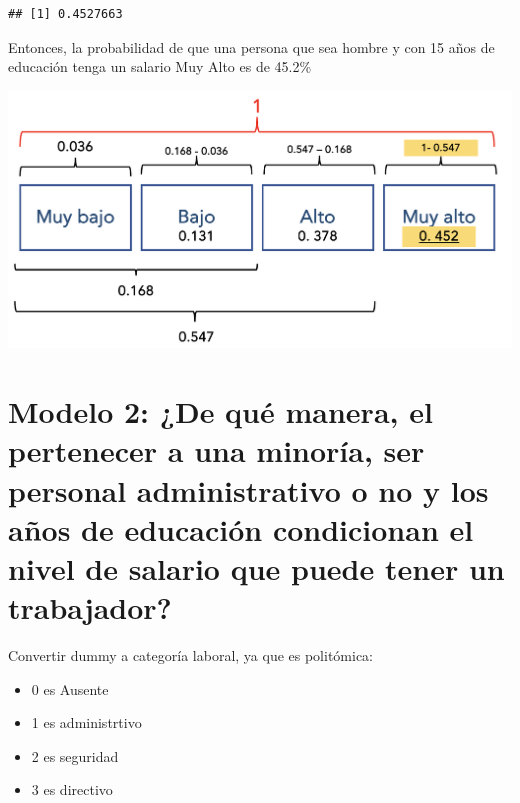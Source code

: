 \documentclass[
]{article}
\newenvironment{Shaded}{\begin{snugshade}}{\end{snugshade}}
\newcommand{\FunctionTok}[1]{\textcolor[rgb]{0.13,0.29,0.53}{\textbf{#1}}}
\newcommand{\NormalTok}[1]{#1}
\newcommand{\SpecialCharTok}[1]{\textcolor[rgb]{0.81,0.36,0.00}{\textbf{#1}}}
\begin{document}
\begin{verbatim}
## [1] 0.4527663
\end{verbatim}

Entonces, la probabilidad de que una persona que sea hombre y con 15
años de educación tenga un salario Muy Alto es de 45.2\%

\begin{center}\includegraphics[width=0.8\linewidth]{pd5_muyalto} \end{center}

\hypertarget{modelo-2-de-quuxe9-manera-el-pertenecer-a-una-minoruxeda-ser-personal-administrativo-o-no-y-los-auxf1os-de-educaciuxf3n-condicionan-el-nivel-de-salario-que-puede-tener-un-trabajador}{%
\section{\texorpdfstring{\textbf{Modelo 2: ¿De qué manera, el pertenecer
a una minoría, ser personal administrativo o no y los años de educación
condicionan el nivel de salario que puede tener un
trabajador?}}{Modelo 2: ¿De qué manera, el pertenecer a una minoría, ser personal administrativo o no y los años de educación condicionan el nivel de salario que puede tener un trabajador?}}\label{modelo-2-de-quuxe9-manera-el-pertenecer-a-una-minoruxeda-ser-personal-administrativo-o-no-y-los-auxf1os-de-educaciuxf3n-condicionan-el-nivel-de-salario-que-puede-tener-un-trabajador}}

Convertir dummy a categoría laboral, ya que es politómica:

\begin{itemize}
\item
  0 es Ausente
\item
  1 es administrtivo
\item
  2 es seguridad
\item
  3 es directivo
\end{itemize}

\begin{Shaded}
\end{Shaded}
\end{document}
